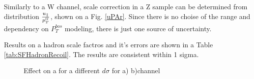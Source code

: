 Similarly to a W channel, scale correction in a Z sample can be determined from distribution $\frac{u_{\parallel}}{p_T^{ll}}$, shown on a Fig. \ref{uPAr}. 
Since there is no choise of the range and dependency on $P_T^{bos}$ modeling, there is just one source of uncertainty.
  
Results on a hadron scale factros and it's errors are shown in a Table \ref{tab:SFHadronRecoil}. The results are consistent within 1 sigma. 

\begin{figure}[!tbp]
\begin{minipage}[h]{0.49\linewidth}
\end{minipage}
\hfill
\begin{minipage}[h]{0.49\linewidth}
\end{minipage}
\caption{Effect on a \cw for a different $d\sigma$ for a) \wenu b)\wmunu channel}
\label{ris:Cw}
\end{figure}

